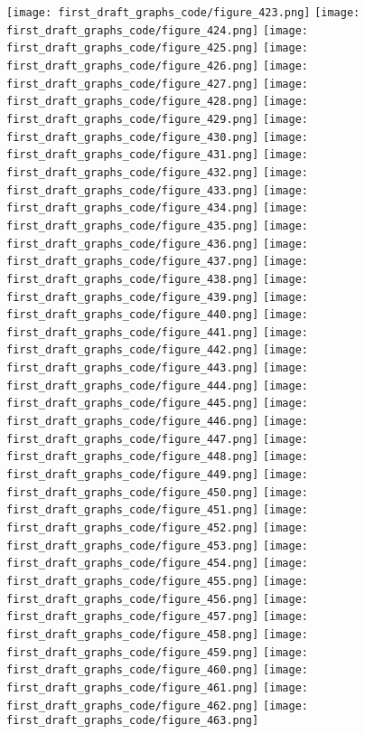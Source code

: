 \documentclass{Assignment}
\begin{document}
\texttt{[image: first\_draft\_graphs\_code/figure\_423.png]}
\texttt{[image: first\_draft\_graphs\_code/figure\_424.png]}
\texttt{[image: first\_draft\_graphs\_code/figure\_425.png]}
\texttt{[image: first\_draft\_graphs\_code/figure\_426.png]}
\texttt{[image: first\_draft\_graphs\_code/figure\_427.png]}
\texttt{[image: first\_draft\_graphs\_code/figure\_428.png]}
\texttt{[image: first\_draft\_graphs\_code/figure\_429.png]}
\texttt{[image: first\_draft\_graphs\_code/figure\_430.png]}
\texttt{[image: first\_draft\_graphs\_code/figure\_431.png]}
\texttt{[image: first\_draft\_graphs\_code/figure\_432.png]}
\texttt{[image: first\_draft\_graphs\_code/figure\_433.png]}
\texttt{[image: first\_draft\_graphs\_code/figure\_434.png]}
\texttt{[image: first\_draft\_graphs\_code/figure\_435.png]}
\texttt{[image: first\_draft\_graphs\_code/figure\_436.png]}
\texttt{[image: first\_draft\_graphs\_code/figure\_437.png]}
\texttt{[image: first\_draft\_graphs\_code/figure\_438.png]}
\texttt{[image: first\_draft\_graphs\_code/figure\_439.png]}
\texttt{[image: first\_draft\_graphs\_code/figure\_440.png]}
\texttt{[image: first\_draft\_graphs\_code/figure\_441.png]}
\texttt{[image: first\_draft\_graphs\_code/figure\_442.png]}
\texttt{[image: first\_draft\_graphs\_code/figure\_443.png]}
\texttt{[image: first\_draft\_graphs\_code/figure\_444.png]}
\texttt{[image: first\_draft\_graphs\_code/figure\_445.png]}
\texttt{[image: first\_draft\_graphs\_code/figure\_446.png]}
\texttt{[image: first\_draft\_graphs\_code/figure\_447.png]}
\texttt{[image: first\_draft\_graphs\_code/figure\_448.png]}
\texttt{[image: first\_draft\_graphs\_code/figure\_449.png]}
\texttt{[image: first\_draft\_graphs\_code/figure\_450.png]}
\texttt{[image: first\_draft\_graphs\_code/figure\_451.png]}
\texttt{[image: first\_draft\_graphs\_code/figure\_452.png]}
\texttt{[image: first\_draft\_graphs\_code/figure\_453.png]}
\texttt{[image: first\_draft\_graphs\_code/figure\_454.png]}
\texttt{[image: first\_draft\_graphs\_code/figure\_455.png]}
\texttt{[image: first\_draft\_graphs\_code/figure\_456.png]}
\texttt{[image: first\_draft\_graphs\_code/figure\_457.png]}
\texttt{[image: first\_draft\_graphs\_code/figure\_458.png]}
\texttt{[image: first\_draft\_graphs\_code/figure\_459.png]}
\texttt{[image: first\_draft\_graphs\_code/figure\_460.png]}
\texttt{[image: first\_draft\_graphs\_code/figure\_461.png]}
\texttt{[image: first\_draft\_graphs\_code/figure\_462.png]}
\texttt{[image: first\_draft\_graphs\_code/figure\_463.png]}
\newpage
\end{document}

